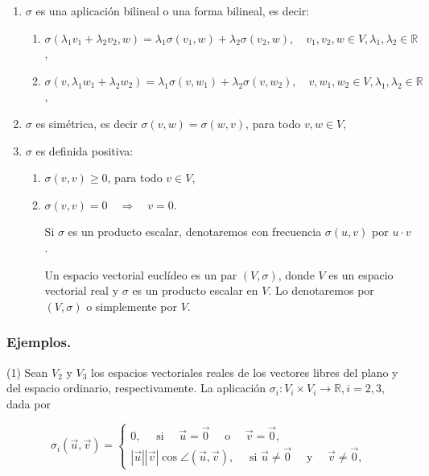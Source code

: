 \documentclass[12pt, a4paper, ones, notitlepage, openany,titlepage]{article}
\begin{document}
\begin{enumerate}
	
	\item $\sigma$ es una aplicación bilineal o una forma bilineal, es decir:
	\begin{enumerate}
		\item $\sigma\left(\lambda_{1} v_{1}+\lambda_{2} v_{2}, w\right)=\lambda_{1} \sigma\left(v_{1}, w\right)+\lambda_{2} \sigma\left(v_{2}, w\right), \quad v_{1}, v_{2}, w \in V, \lambda_{1}, \lambda_{2} \in \mathbb{R}$,
		\item $\sigma\left(v, \lambda_{1} w_{1}+\lambda_{2} w_{2}\right)=\lambda_{1} \sigma\left(v, w_{1}\right)+\lambda_{2} \sigma\left(v, w_{2}\right), \quad v, w_{1}, w_{2} \in V, \lambda_{1}, \lambda_{2} \in \mathbb{R}$,
	\end{enumerate}
	\item $\sigma$ es simétrica, es decir $\sigma(v, w)=\sigma(w, v)$, para todo $v, w \in V$,
	
	\item $\sigma$ es definida positiva:
	
	\begin{enumerate}
		\item $\sigma(v, v) \geq 0$, para todo $v \in V$,
		
		\item $\sigma(v, v)=0 \quad \Rightarrow \quad v=0$.
		
		Si $\sigma$ es un producto escalar, denotaremos con frecuencia $\sigma(u, v)$ por $u \cdot v$.
		
		Un espacio vectorial euclídeo es un par $(V, \sigma)$, donde $V$ es un espacio vectorial real y $\sigma$ es un producto escalar en $V$. Lo denotaremos por $(V, \sigma)$ o simplemente por $V$.
	\end{enumerate}
\end{enumerate}
\subsubsection{Ejemplos.}
(1) Sean $V_{2}$ y $V_{3}$ los espacios vectoriales reales de los vectores libres del plano y del espacio ordinario, respectivamente. La aplicación $\sigma_{i}: V_{i} \times V_{i} \rightarrow \mathbb{R}, i=2,3$, dada por

$$
\sigma_{i}(\vec{u}, \vec{v})=\left\{\begin{array}{l}
	0, \quad \text { si } \quad \vec{u}=\overrightarrow{0} \quad \text { o } \quad \vec{v}=\overrightarrow{0}, \\
	|\vec{u}||\vec{v}| \cos \angle(\vec{u}, \vec{v}), \quad \text { si } \vec{u} \neq \overrightarrow{0} \quad \text { y } \quad \vec{v} \neq \overrightarrow{0},
\end{array}\right.
$$
\end{document}
